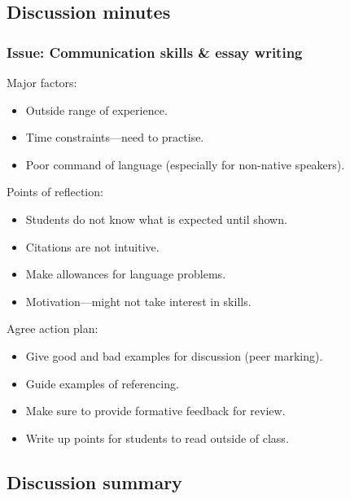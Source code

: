\subsection{Discussion minutes}\label{sec:ALS-notes}

\subsubsection{Issue: Communication skills \& essay writing}

Major factors:
\begin{itemize}
\item Outside range of experience.
\item Time constraints---need to practise.
\item Poor command of language (especially for non-native speakers).
\end{itemize}

Points of reflection:
\begin{itemize}
\item Students do not know what is expected until shown.
\item Citations are not intuitive.
\item Make allowances for language problems.
\item Motivation---might not take interest in skills.
\end{itemize}

Agree action plan:
\begin{itemize}
\item Give good and bad examples for discussion (peer marking).
\item Guide examples of referencing.
\item Make sure to provide formative feedback for review.
\item Write up points for students to read outside of class.
\end{itemize}

\subsection{Discussion summary}\label{sec:ALS-conclusion}

